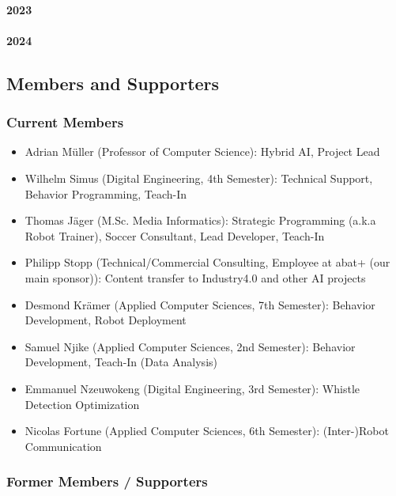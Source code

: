 \paragraph{2023} %

\paragraph{2024} %

\subsection{Members and Supporters}

\subsubsection{Current Members}
\begin{itemize}
	\item Adrian Müller (Professor of Computer Science): Hybrid AI, Project Lead
	\item Wilhelm Simus (Digital Engineering, 4th Semester): Technical Support, Behavior Programming, Teach-In
	\item Thomas Jäger (M.Sc. Media Informatics): Strategic Programming (a.k.a Robot Trainer), Soccer Consultant, Lead Developer, Teach-In
	\item Philipp Stopp (Technical/Commercial Consulting, Employee at abat+ (our main sponsor)): Content transfer to Industry4.0 and other AI projects
	\item Desmond Krämer (Applied Computer Sciences, 7th Semester): Behavior Development, Robot Deployment
	\item Samuel Njike (Applied Computer Sciences, 2nd Semester): Behavior Development, Teach-In (Data Analysis)
	\item Emmanuel Nzeuwokeng (Digital Engineering, 3rd Semester): Whistle Detection Optimization
	\item Nicolas Fortune (Applied Computer Sciences, 6th Semester): (Inter-)Robot Communication
\end{itemize}

\subsubsection{Former Members / Supporters}

